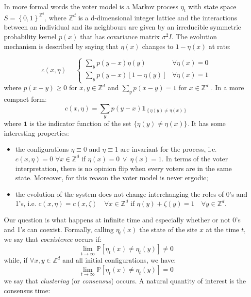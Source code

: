 In more formal words the voter model is a Markov process $\eta_{t}$
with state space $S=\left\{ 0,1\right\} ^{\mathbb{Z}^{d}}$, where
$\mathbb{Z}^{d}$ is a d-dimensional integer lattice and the interactions
between an individual and its neighbours are given by an irreducible
symmetric probability kernel $p\left(x\right)$ that has covariance
matrix $\sigma^{2}I$. The evolution mechanism is described by saying
that $\eta\left(x\right)$ changes to $1-\eta\left(x\right)$ at rate:

\[
c\left(x,\eta\right)=\begin{cases}
\sum_{y}p\left(y-x\right)\eta\left(y\right) & \forall\eta(x)=0\\
\sum_{y}p\left(y-x\right)\left[1-\eta\left(y\right)\right] & \forall\eta(x)=1
\end{cases}
\]
where $p\left(x-y\right)\geq0$ for $x,y\in\mathbb{Z}^{d}$ and $\sum_{y}p\left(x-y\right)=1$
for $x\in\mathbb{Z}^{d}$ . In a more compact form:
\begin{equation}
c\left(x,\eta\right)=\sum_{y}p\left(y-x\right)\mathbf{1}_{\left\{ \eta\left(y\right)\neq\eta\left(x\right)\right\} }\label{eq:rate}
\end{equation}
where $\mathbf{1}$ is the indicator function of the set $\{\eta(y)\ne\eta(x)\}$.
It has some interesting properties:
\begin{itemize}
\item the configurations $\eta\equiv0$ and $\eta\equiv1$ are invariant
for the process, i.e. $c\left(x,\eta\right)=0$ $\forall x\in\mathbb{Z}^{d}$
if $\eta\left(x\right)=0\ \vee\ \eta\left(x\right)=1$. In terms of
the voter interpretation, there is no opinion flip when every voters
are in the same state. Moreover, for this reason the voter model is
never ergodic;
\item the evolution of the system does not change interchanging the roles
of 0's and 1's, i.e. $c\left(x,\eta\right)=c\left(x,\zeta\right)\quad\forall x\in\mathbb{Z}^{d}$
if $\eta\left(y\right)+\zeta\left(y\right)=1\quad\forall y\in\mathbb{Z}^{d}$.
\end{itemize}
Our question is what happens at infinite time and especially whether
or not 0's and 1's can coexist. Formally, calling $\eta_{t}\left(x\right)$
the state of the site $x$ at the time $t$, we say that \textit{coexistence}
occurs if: 
\[
\lim_{t\rightarrow\infty}\mathbb{P}[\eta_{t}(x)\neq\eta_{t}(y)]\neq0
\]
 while, if $\forall x,y\in\mathbb{Z}^{d}$ and all initial configurations,
we have: 
\[
\lim_{t\rightarrow\infty}\mathbb{P}[\eta_{t}(x)\neq\eta_{t}(y)]=0
\]
we say that \textit{clustering }(or \textit{consensus}) occurs. A
natural quantity of interest is the consensus time:

